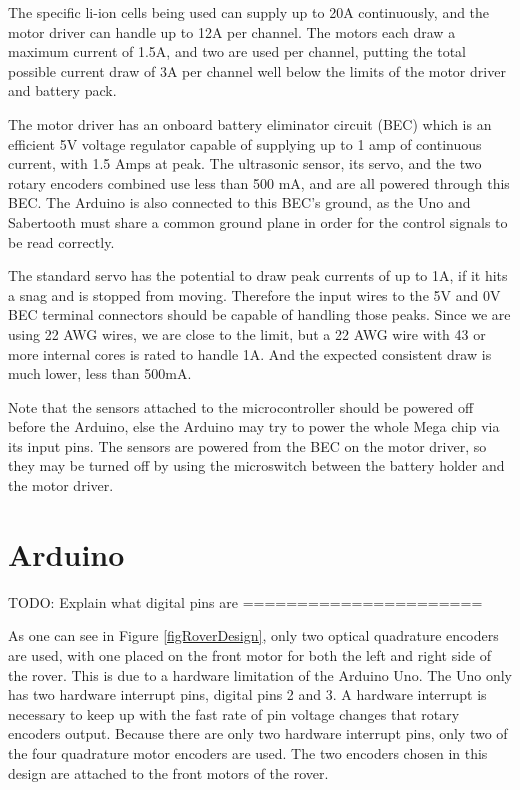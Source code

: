 The specific li-ion cells being used can supply up to 20A continuously, and the motor driver can handle up to 12A per channel. The motors each draw a maximum current of 1.5A, and two are used per channel, putting the total possible current draw of 3A per channel well below the limits of the motor driver and battery pack.

The motor driver has an onboard battery eliminator circuit (BEC) which is an efficient 5V voltage regulator capable of supplying up to 1 amp of continuous current, with 1.5 Amps at peak. The ultrasonic sensor, its servo, and the two rotary encoders combined use less than 500 mA, and are all powered through this BEC. The Arduino is also connected to this BEC's ground, as the Uno and Sabertooth must share a common ground plane in order for the control signals to be read correctly. \cite{sabertoothUserGuide}

The standard servo has the potential to draw peak currents of up to 1A, if it hits a snag and is stopped from moving. Therefore the input wires to the 5V and 0V BEC terminal connectors should be capable of handling those peaks. Since we are using 22 AWG wires, we are close to the limit, but a 22 AWG wire with 43 or more internal cores is rated to handle 1A. And the expected consistent draw is much lower, less than 500mA. 

Note that the sensors attached to the microcontroller should be powered off before the Arduino, else the Arduino may try to power the whole Mega chip via its input pins. The sensors are powered from the BEC on the motor driver, so they may be turned off by using the microswitch between the battery holder and the motor driver.

\section{Arduino}

TODO: Explain what digital pins are
======================

As one can see in Figure \ref{figRoverDesign}, only two optical quadrature encoders are used, with one placed on the front motor for both the left and right side of the rover. This is due to a hardware limitation of the Arduino Uno. The Uno only has two hardware interrupt pins, digital pins 2 and 3. A hardware interrupt is necessary to keep up with the fast rate of pin voltage changes that rotary encoders output. Because there are only two hardware interrupt pins, only two of the four quadrature motor encoders are used. The two encoders chosen in this design are attached to the front motors of the rover.

